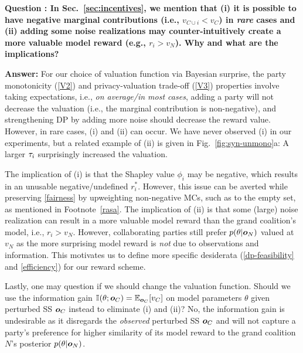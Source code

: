 \documentclass{article}
\theoremstyle{plain}
\theoremstyle{definition}
\theoremstyle{remark}
\begin{document}
\textbf{Question : In Sec.~\ref{sec:incentives}, we mention that (i) it is possible to have negative marginal contributions (i.e., $v_{C \cup i} < v_C$) in \emph{rare} cases and (ii) adding some noise realizations may counter-intuitively create a more valuable model reward (e.g., $r_i > v_N$). Why and what are the implications?
}

\textbf{Answer:}
For our choice of valuation function via Bayesian surprise, the party monotonicity (\ref{V2}) and privacy-valuation trade-off (\ref{V3}) properties involve taking expectations, i.e., \emph{on average/in most cases}, adding a party will not decrease the valuation (i.e., the marginal contribution is non-negative), and strengthening DP by adding more noise should decrease the reward value. However, in rare cases, (i) and (ii) can occur. We have never observed (i) in our experiments, but a related example of (ii) is given in Fig.~\ref{fig:syn-unmono}a: A larger ${\tau_i}$ surprisingly increased the valuation.

The implication of (i) is that the Shapley value $\phi_i$ may be negative, which results in an unusable negative/undefined $r^*_i$. However, this issue can be averted while preserving \ref{fairness} by upweighting non-negative MCs, such as to the empty set, as mentioned in Footnote~\ref{rasa}.
The implication of (ii) is that some (large) noise realization can result in a more valuable model reward than the grand coalition's model, i.e., $r_i > v_N$. However, collaborating parties still prefer $p(\theta|{\bm{o}}_N)$ valued at $v_N$ as the more surprising model reward is \emph{not} due to observations and information. This motivates us to define more specific desiderata (\ref{dp-feasibility} and \ref{efficiency}) for our reward scheme.

Lastly, one may question if we should change the valuation function. Should we use the information gain $\mathbb{I}\hspace{-0.5mm}\left(\theta; {\bm{o}}_C\right) = \mathbb{E}_{{\bm{o}}_C}[v_C]$ on model parameters $\theta$ given perturbed SS ${\bm{o}}_C$  instead to eliminate (i) and (ii)? No, the information gain is undesirable as it disregards the \emph{observed} perturbed SS ${\bm{o}}_C$ and will not capture a party's preference for higher similarity of its model reward to the grand coalition $N$'s posterior $p(\theta|{\bm{o}}_N)$.
\end{document}
